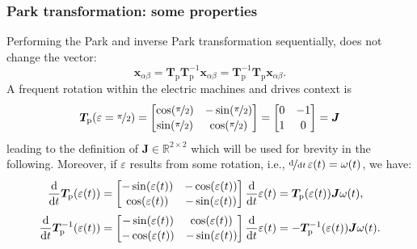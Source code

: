 \begin{frame}
	\frametitle{Park transformation: some properties}
    Performing the Park and inverse Park transformation sequentially, does not change the vector:
    \begin{equation}
        \bm{x}_{\alpha \beta} = \bm{T}_\mathrm{p} \bm{T}_\mathrm{p}^{-1} \bm{x}_{\alpha \beta} = \bm{T}_\mathrm{p}^{-1} \bm{T}_\mathrm{p} \bm{x}_{\alpha \beta}.
    \end{equation}
    A frequent rotation within the electric machines and drives context is
    \begin{equation}
        \renewcommand{\arraystretch}{1.1}
         \bm{T}_\mathrm{p}(\varepsilon = \nicefrac{\pi}{2}) = \begin{bmatrix}
            \cos(\nicefrac{\pi}{2}) & -\sin(\nicefrac{\pi}{2})\\
            \sin(\nicefrac{\pi}{2}) & \cos(\nicefrac{\pi}{2})
        \end{bmatrix} = \begin{bmatrix}
            0 & -1\\
            1 & 0
        \end{bmatrix} = \bm{J}
    \end{equation}
    leading to the definition of $\bm{J}\in\mathbb{R}^{2 \times 2}$ which will be used for brevity in the following.  Moreover, if $\varepsilon$ results from some rotation, i.e., $\nicefrac{\mathrm{d}}{\mathrm{d}t}\,\varepsilon(t)=\omega(t)$, we have:
    \begin{align}
        \renewcommand{\arraystretch}{1.1}
        \frac{\mathrm{d}}{\mathrm{d}t}\bm{T}_\mathrm{p}(\varepsilon(t)) &= \begin{bmatrix}
            -\sin(\varepsilon(t)) & -\cos(\varepsilon(t))\\
            \cos(\varepsilon(t)) & -\sin(\varepsilon(t))
        \end{bmatrix} \frac{\mathrm{d}}{\mathrm{d}t}\varepsilon(t)  = \bm{T}_\mathrm{p}(\varepsilon(t)) \bm{J}\omega(t),\\
        \frac{\mathrm{d}}{\mathrm{d}t}\bm{T}_\mathrm{p}^{-1}(\varepsilon(t)) &= \begin{bmatrix}
            -\sin(\varepsilon(t)) & \cos(\varepsilon(t))\\
            -\cos(\varepsilon(t)) & -\sin(\varepsilon(t))
        \end{bmatrix} \frac{\mathrm{d}}{\mathrm{d}t}\varepsilon(t)  = -\bm{T}_\mathrm{p}^{-1}(\varepsilon(t)) \bm{J}\omega(t).
        \label{eq:Park_transformation_derivative}
    \end{align}
\end{frame}

